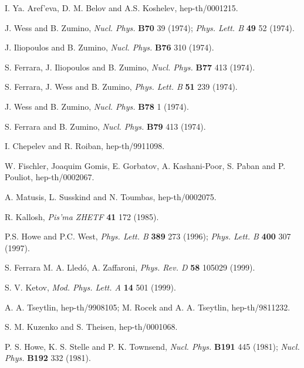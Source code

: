 \documentclass[a4paper,12pt]{article}
\begin{document}
\begin{thebibliography}{100}
 I. Ya. Aref'eva, D. M. Belov and A.S. Koshelev,
hep-th/0001215.




 J. Wess and B. Zumino, {\it Nucl. Phys.} {\bf B70} 39 (1974); 
{\it Phys. Lett. B } {\bf 49} 52 (1974).

 J. Iliopoulos and B. Zumino, {\it Nucl. Phys.} {\bf B76} 310
(1974).

 S. Ferrara, J. Iliopoulos and B. Zumino, {\it Nucl. Phys.}
{\bf B77} 413 (1974).

 S. Ferrara, J. Wess and B. Zumino, {\it  Phys. Lett. B} {\bf
51} 239 (1974).

 J. Wess and B. Zumino, {\it Nucl. Phys.} {\bf B78} 1 (1974).

 S. Ferrara and B. Zumino, {\it Nucl. Phys.} {\bf B79}  413
(1974).


  I. Chepelev and  R. Roiban,  hep-th/9911098.

  W. Fischler, Joaquim Gomis, E. Gorbatov, A. Kashani-Poor, S.
Paban and P. Pouliot, hep-th/0002067.

  A. Matusis, L. Susskind and  N. Toumbas, hep-th/0002075.

 R. Kallosh, {\it Pis'ma ZHETF} {\bf 41} 172 (1985).

 P.S. Howe and P.C. West, {\it Phys. Lett. B} {\bf 389} 273 (1996);
{\it Phys. Lett. B} {\bf 400} 307 (1997).

 S. Ferrara M. A. Lled\'o, A. Zaffaroni, {\it Phys. Rev. D}
{\bf 58} 105029 (1999).

 S. V. Ketov, {\it Mod. Phys. Lett. A} {\bf 14} 501 (1999).

 A. A. Tseytlin,  hep-th/9908105; M. Rocek and A. A. Tseytlin,
hep-th/9811232.

 S. M. Kuzenko and S. Theisen, hep-th/0001068.

 P. S. Howe, K. S.  Stelle and P. K. Townsend, {\it Nucl.
Phys.} {\bf B191} 445 (1981);
{\it Nucl. Phys.} {\bf B192} 332 (1981).



\end{thebibliography} 
\end{document}
